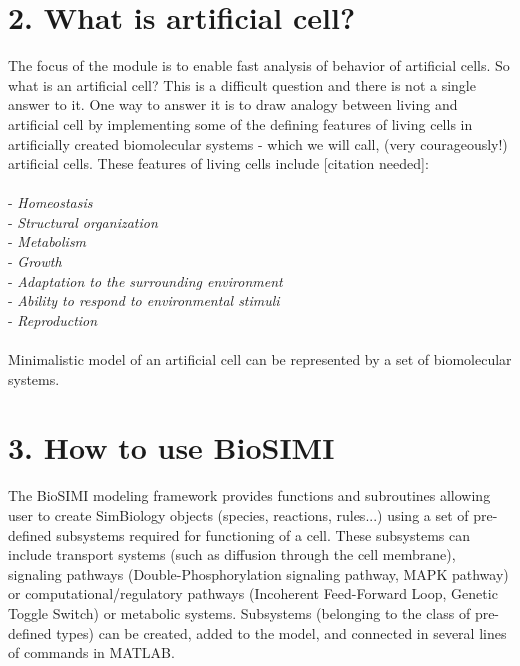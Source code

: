 \documentclass{article}
\begin{document}
	\section*{2. What is artificial cell?}
The focus of the module is to enable fast analysis of behavior of artificial cells. So what is an artificial cell? This is a difficult question and there is not a single answer to it. One way to answer it is to draw analogy between living and artificial cell by implementing some of the defining features of living cells in artificially created biomolecular systems - which we will call, (very courageously!) artificial cells. These features of living cells include [citation needed]: 
\\
\\ - \textit{Homeostasis}
\\ - \textit{Structural organization}
\\ - \textit{Metabolism}
\\ - \textit{Growth}
\\ - \textit{Adaptation to the surrounding environment}
\\ - \textit{Ability to respond to environmental stimuli}
\\ - \textit{Reproduction}
\\
\\
Minimalistic model of an artificial cell can be represented by a set of biomolecular systems.
\\
	\section*{3. How to use BioSIMI}
The BioSIMI modeling framework provides functions and subroutines allowing user to create SimBiology objects (species, reactions, rules...) using a set of pre-defined subsystems required for functioning of a cell. These subsystems can include transport systems (such as diffusion through the cell membrane), signaling pathways (Double-Phosphorylation signaling pathway, MAPK pathway) or computational/regulatory pathways (Incoherent Feed-Forward Loop, Genetic Toggle Switch) or metabolic systems. Subsystems (belonging to the class of pre-defined types) can be created, added to the model, and connected in several lines of commands in MATLAB.
\\
\end{document}
